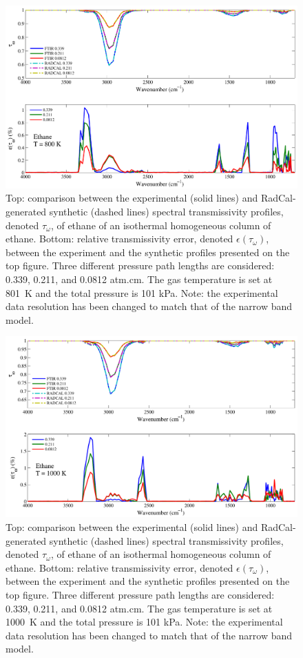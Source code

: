 \begin{figure}[p]
\includegraphics[width=\textwidth]{../Verification/Results_Test2/Ethane_800.pdf}
\caption{Top: comparison between the experimental (solid lines) and RadCal-generated synthetic (dashed lines) spectral transmissivity profiles, denoted $\tau_{\omega}$, of ethane of an isothermal homogeneous column of ethane. Bottom: relative transmissivity error, denoted $\epsilon{(\tau_{\omega})}$, between the experiment and the synthetic profiles presented on the top figure. Three different pressure path lengths are considered: 0.339, 0.211, and 0.0812 atm.cm. The gas temperature is set at 801~K and the total pressure is 101 kPa. Note: the experimental data resolution has been changed to match that of the narrow band model. \label{fig:ethane_Verify_800K}}
\end{figure}

\begin{figure}[p]
\includegraphics[width=\textwidth]{../Verification/Results_Test2/Ethane_1000.pdf}
\caption{Top: comparison between the experimental (solid lines) and RadCal-generated synthetic (dashed lines) spectral transmissivity profiles, denoted $\tau_{\omega}$, of ethane of an isothermal homogeneous column of ethane. Bottom: relative transmissivity error, denoted $\epsilon{(\tau_{\omega})}$, between the experiment and the synthetic profiles presented on the top figure. Three different pressure path lengths are considered: 0.339, 0.211, and 0.0812 atm.cm. The gas temperature is set at 1000~K and the total pressure is 101 kPa. Note: the experimental data resolution has been changed to match that of the narrow band model. \label{fig:ethane_Verify_1000K}}
\end{figure}


